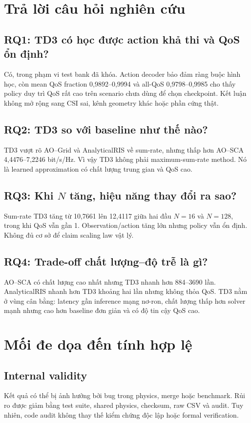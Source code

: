 \section{Trả lời câu hỏi nghiên cứu}
\subsection{RQ1: TD3 có học được action khả thi và QoS ổn định?}
Có, trong phạm vi test bank đã khóa. Action decoder bảo đảm ràng buộc hình học, còn mean QoS fraction 0,9892--0,9994 và all-QoS 0,9798--0,9985 cho thấy policy duy trì QoS rất cao trên scenario chưa dùng để chọn checkpoint. Kết luận không mở rộng sang CSI sai, kênh geometry khác hoặc phần cứng thật.

\subsection{RQ2: TD3 so với baseline như thế nào?}
TD3 vượt rõ AO--Grid và AnalyticalRIS về sum-rate, nhưng thấp hơn AO--SCA 4,4476--7,2246 bit/s/Hz. Vì vậy TD3 không phải maximum-sum-rate method. Nó là learned approximation có chất lượng trung gian và QoS cao.

\subsection{RQ3: Khi $N$ tăng, hiệu năng thay đổi ra sao?}
Sum-rate TD3 tăng từ 10,7661 lên 12,4117 giữa hai đầu $N=16$ và $N=128$, trong khi QoS vẫn gần 1. Observation/action tăng lớn nhưng policy vẫn ổn định. Không đủ cơ sở để claim scaling law vật lý.

\subsection{RQ4: Trade-off chất lượng--độ trễ là gì?}
AO--SCA có chất lượng cao nhất nhưng TD3 nhanh hơn 884--3690 lần. AnalyticalRIS nhanh hơn TD3 khoảng hai lần nhưng không thỏa QoS. TD3 nằm ở vùng cân bằng: latency gần inference mạng nơ-ron, chất lượng thấp hơn solver mạnh nhưng cao hơn baseline đơn giản và có độ tin cậy QoS cao.

\section{Mối đe dọa đến tính hợp lệ}
\subsection{Internal validity}
Kết quả có thể bị ảnh hưởng bởi bug trong physics, merge hoặc benchmark. Rủi ro được giảm bằng test suite, shared physics, checksum, raw CSV và audit. Tuy nhiên, code audit không thay thế kiểm chứng độc lập hoặc formal verification.

